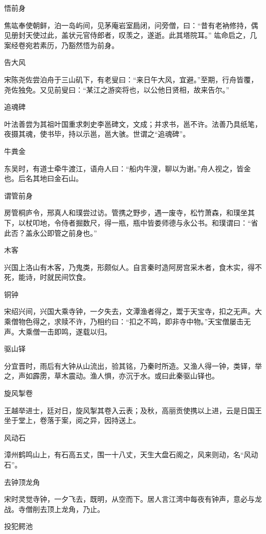 \documentclass[a4paper,12pt,UTF8,twoside]{ctexbook}
\begin{document}
    悟前身
    
    焦竑奉使朝鲜，泊一岛屿间，见茅庵岩室扃闭，问旁僧，曰：“昔有老衲修持，偶见册封天使过此，盖状元官侍郎者，叹羡之，遂逝。此其塔院耳。” 竑命启之，几案经卷宛若素历，乃豁然悟为前身。
    
    告大风
    
    宋陈尧佐尝泊舟于三山矶下，有老叟曰：“来日午大风，宜避。”至期，行舟皆覆，尧佐独免。又见前叟曰：“某江之游奕将也，以公他日贤相，故来告尔。”
    
    追魂碑
    
    叶法善尝为其祖叶国重求刺史李邕碑文，文成；并求书，邕不许。法善乃具纸笔，夜摄其魂，使书毕，持以示邕，邕大骇。世谓之“追魂碑”。
    
    牛粪金
    
    东吴时，有道士牵牛渡江，语舟人曰：“船内牛溲，聊以为谢。”舟人视之，皆金也。后名其地曰金石山。
    
    谓管前身
    
    房管桐庐令，邢真人和璞尝过访。管携之野步，遇一废寺，松竹萧森，和璞坐其下，以杖叩地，令侍者掘数尺，得一瓶，瓶中皆娄师德与永公书。和璞谓曰：“省此否？盖永公即管之前身也。”
    
    木客
    
    兴国上洛山有木客，乃鬼类，形颇似人。自言秦时造阿房宫采木者，食木实，得不死，能诗，时就民间饮食。
    
    铜钟
    
    宋绍兴间，兴国大乘寺钟，一夕失去，文潭渔者得之，鬻于天宝寺，扣之无声。大乘僧物色得之，求赎不许，乃相约曰：“扣之不鸣，即非寺中物。”天宝僧屡击无声。大乘僧一击即鸣，遂载以归。
    
    驱山铎
    
    分宜晋时，雨后有大钟从山流出，验其铭，乃秦时所造。又渔人得一钟，类铎，举之，声如霹雳，草木震动。渔人惧，亦沉于水。或曰此秦驱山铎也。
    
    旋风掣卷
    
    王越举进士，廷对日，旋风掣其卷入云表；及秋，高丽贡使携以上进，云是日国王坐于堂上，卷落于案，阅之异，因持送上。
    
    风动石
    
    漳州鹤鸣山上，有石高五丈，围一十八丈，天生大盘石阁之，风来则动，名“风动石”。
    
    去钟顶龙角
    
    宋时灵觉寺钟，一夕飞去，既明，从空而下。居人言江湾中每夜有钟声，意必与龙战。寺僧削去顶上龙角，乃止。
    
    投犯鳄池
    
\end{document}
